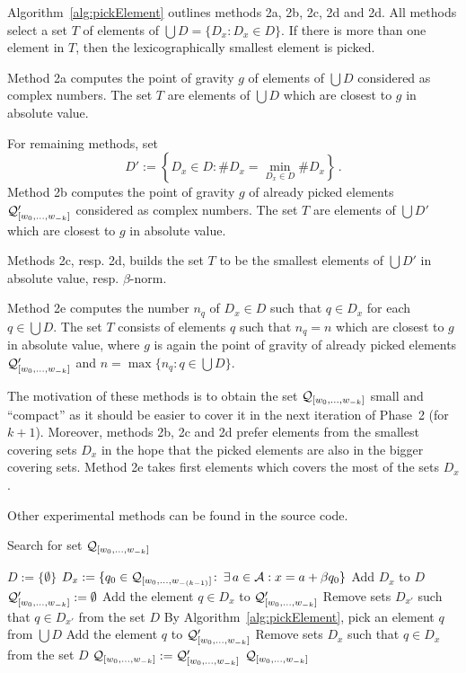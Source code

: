 Algorithm~\ref{alg:pickElement} outlines methods 2a, 2b, 2c, 2d and 2d. All methods select a set $T$ of elements of $\bigcup D = \{D_x \colon D_x \in D\}$. If there is more than one element in $T$, then the lexicographically smallest element is picked.

Method 2a computes the point of gravity $g$ of elements of $\bigcup D$ considered as complex numbers. The set $T$ are elements of  $\bigcup D$ which are closest to $g$ in absolute value. 

For remaining methods, set
$$D':=\left\{D_x \in D \colon \#D_x=\min_{D_x\in D} \#D_x \right\}\,.$$
Method 2b computes the point of gravity $g$ of already picked elements $\mathcal{Q}_{[w_{0}, \dots, w_{-k}]}'$ considered as complex numbers. The set $T$ are elements of  $\bigcup D'$ which are closest to $g$ in absolute value. 

Methods 2c, resp. 2d, builds the set $T$ to be the smallest elements of  $\bigcup D'$ in absolute value, resp.  $\beta$-norm. 

Method 2e computes the number $n_q$ of $D_x\in D$ such that $q\in D_x$ for each $q \in \bigcup D$. The set $T$ consists of elements $q$ such that $n_q=n$ which are closest to $g$ in absolute value, where $g$ is again the point of gravity of already picked elements $\mathcal{Q}_{[w_{0}, \dots, w_{-k}]}'$ and $n=\max\{n_q\colon q\in \bigcup D\}$.

The motivation of these methods is to obtain the set $\mathcal{Q}_{[w_{0}, \dots, w_{-k}]}$ small and ``compact'' as it should be easier to cover it in the next iteration of Phase~2 (for $k+1$). Moreover, methods 2b, 2c and 2d prefer elements from the smallest covering sets $D_x$ in the hope that the picked elements are also in the bigger covering sets. Method 2e takes first elements which covers the most of the sets $D_x$.

Other experimental methods can be found in the source code. 

\begin{algorithm}
  \caption{Search for set $\mathcal{Q}_{[w_{0}, \dots, w_{-k}]}$ }
    \label{alg:minimalSet}
  \begin{algorithmic}[1]
    \STATE $D:=\{\emptyset\}$
    	\STATE $D_x:= \{q_0\in\mathcal{Q}_{[w_{0}, \dots, w_{-(k-1)}]}\colon\, \exists \, a\in\mathcal{A}: x=a+\beta q_0 \}$
        \STATE Add $D_x$ to $D$
    \ENDFOR
    \STATE $\mathcal{Q}_{[w_{0}, \dots, w_{-k}]}':=\emptyset$
    		\STATE Add the element $q\in D_x$ to $\mathcal{Q}_{[w_{0}, \dots, w_{-k}]}'$
	        \STATE Remove sets $D_{x'}$ such that $q \in D_{x'}$  from the set $D$ 
	    \ENDIF
	\ENDFOR
        \STATE By Algorithm~\ref{alg:pickElement},  pick an element $q$ from $\bigcup D$
        \STATE Add the element $q$ to $\mathcal{Q}_{[w_{0}, \dots, w_{-k}]}'$
        \STATE Remove sets $D_x$ such that $q \in D_x$  from the set $D$ 
    \ENDWHILE
	\STATE $\mathcal{Q}_{[w_{0}, \dots, w_{-k}]}:=\mathcal{Q}_{[w_{0}, \dots, w_{-k}]}'$
    \RETURN $\mathcal{Q}_{[w_{0}, \dots, w_{-k}]}$
  \end{algorithmic}
\end{algorithm}


